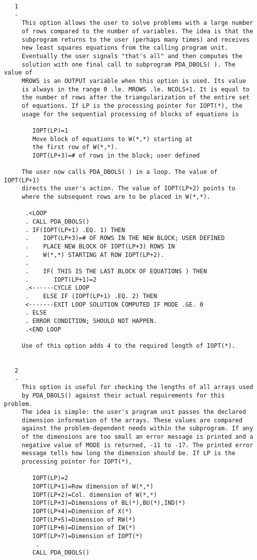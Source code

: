 \begin{verbatim}
   1
   -
     This option allows the user to solve problems with a large number
     of rows compared to the number of variables. The idea is that the
     subprogram returns to the user (perhaps many times) and receives
     new least squares equations from the calling program unit.
     Eventually the user signals "that's all" and then computes the
     solution with one final call to subprogram PDA_DBOLS( ). The value of
     MROWS is an OUTPUT variable when this option is used. Its value
     is always in the range 0 .le. MROWS .le. NCOLS+1. It is equal to
     the number of rows after the triangularization of the entire set
     of equations. If LP is the processing pointer for IOPT(*), the
     usage for the sequential processing of blocks of equations is

        IOPT(LP)=1
        Move block of equations to W(*,*) starting at
        the first row of W(*,*).
        IOPT(LP+3)=# of rows in the block; user defined

     The user now calls PDA_DBOLS( ) in a loop. The value of IOPT(LP+1)
     directs the user's action. The value of IOPT(LP+2) points to
     where the subsequent rows are to be placed in W(*,*).

      .<LOOP
      . CALL PDA_DBOLS()
      . IF(IOPT(LP+1) .EQ. 1) THEN
      .    IOPT(LP+3)=# OF ROWS IN THE NEW BLOCK; USER DEFINED
      .    PLACE NEW BLOCK OF IOPT(LP+3) ROWS IN
      .    W(*,*) STARTING AT ROW IOPT(LP+2).
      .
      .    IF( THIS IS THE LAST BLOCK OF EQUATIONS ) THEN
      .       IOPT(LP+1)=2
      .<------CYCLE LOOP
      .    ELSE IF (IOPT(LP+1) .EQ. 2) THEN
      <-------EXIT LOOP SOLUTION COMPUTED IF MODE .GE. 0
      . ELSE
      . ERROR CONDITION; SHOULD NOT HAPPEN.
      .<END LOOP

     Use of this option adds 4 to the required length of IOPT(*).


   2
   -
     This option is useful for checking the lengths of all arrays used
     by PDA_DBOLS() against their actual requirements for this problem.
     The idea is simple: the user's program unit passes the declared
     dimension information of the arrays. These values are compared
     against the problem-dependent needs within the subprogram. If any
     of the dimensions are too small an error message is printed and a
     negative value of MODE is returned, -11 to -17. The printed error
     message tells how long the dimension should be. If LP is the
     processing pointer for IOPT(*),

        IOPT(LP)=2
        IOPT(LP+1)=Row dimension of W(*,*)
        IOPT(LP+2)=Col. dimension of W(*,*)
        IOPT(LP+3)=Dimensions of BL(*),BU(*),IND(*)
        IOPT(LP+4)=Dimension of X(*)
        IOPT(LP+5)=Dimension of RW(*)
        IOPT(LP+6)=Dimension of IW(*)
        IOPT(LP+7)=Dimension of IOPT(*)
         .
        CALL PDA_DBOLS()


\end{verbatim}
